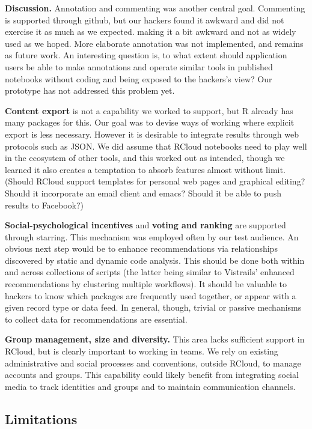 {\bf Discussion.} Annotation and commenting was another central goal.
Commenting is supported through github, but our hackers found it
awkward and did not exercise it as much as we expected.
making it a bit awkward and
not as widely used as we hoped.  More elaborate annotation was not
implemented, and remains as future work.
An interesting question is, to what extent should application users
be able to make annotations and operate similar tools in published
notebooks without coding and being exposed to the hackers's view?
Our prototype has not addressed this problem yet.

{\bf Content export} is not a capability we worked to support,
but R already has many packages for this. Our goal was to devise
ways of working where explicit export is less necessary.
However it is desirable to integrate results
through web protocols such as JSON. We did assume that RCloud
notebooks need to play well in the ecosystem of other tools,
and this worked out as intended, though we learned it also creates
a temptation to absorb features almost without limit. (Should
RCloud support templates for personal web pages and graphical
editing? Should it incorporate an email client and emacs?
Should it be able to push results to Facebook?)

{\bf Social-psychological incentives} and {\bf voting and ranking}
are supported through starring. This mechanism was employed often
by our test audience. An obvious next step would be to enhance
recommendations via relationships discovered by static and
dynamic code analysis. This should be done both within and across
collections of scripts (the latter being similar to Vistrails'
enhanced recommendations by clustering multiple workflows).
It should be valuable to hackers to know which packages are
frequently used together, or appear with a given record type
or data feed. In general, though, trivial or passive mechanisms
to collect data for recommendations are essential.

{\bf Group management, size and diversity.} This area lacks sufficient
support in RCloud, but is clearly important to working in teams.
We rely on existing administrative and social processes and conventions,
outside RCloud, to manage accounts and groups. This capability
could likely benefit from integrating social media to track
identities and groups and to maintain communication channels.

\subsection{Limitations}

